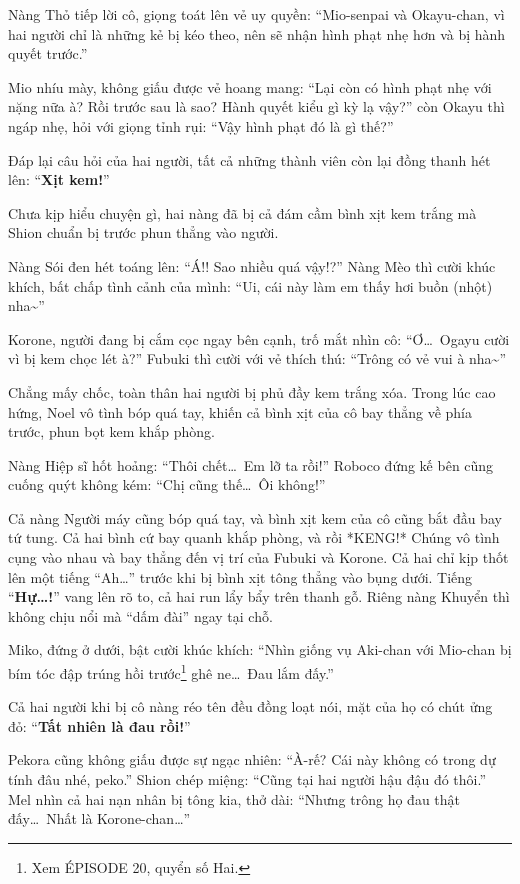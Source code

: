 \documentclass[../main.tex]{subfiles}
\begin{document}
Nàng Thỏ tiếp lời cô, giọng toát lên vẻ uy quyền: ``Mio-senpai và Okayu-chan, vì hai người chỉ là những kẻ bị kéo theo, nên sẽ nhận hình phạt nhẹ hơn và bị hành quyết trước.''

Mio nhíu mày, không giấu được vẻ hoang mang: ``Lại còn có hình phạt nhẹ với nặng nữa à? Rồi trước sau là sao? Hành quyết kiểu gì kỳ lạ vậy?'' còn Okayu thì ngáp nhẹ, hỏi với giọng tỉnh rụi: ``Vậy hình phạt đó là gì thế?''

Đáp lại câu hỏi của hai người, tất cả những thành viên còn lại đồng thanh hét lên: ``\textbf{Xịt kem!}''

Chưa kịp hiểu chuyện gì, hai nàng đã bị cả đám cầm bình xịt kem trắng mà Shion chuẩn bị trước phun thẳng vào người.

Nàng Sói đen hét toáng lên: ``Á!! Sao nhiều quá vậy!?'' Nàng Mèo thì cười khúc khích, bất chấp tình cảnh của mình: ``Ui, cái này làm em thấy hơi buồn (nhột) nha\~{}''

Korone, người đang bị cắm cọc ngay bên cạnh, trố mắt nhìn cô: ``Ơ\dots\ Ogayu cười vì bị kem chọc lét à?'' Fubuki thì cười với vẻ thích thú: ``Trông có vẻ vui à nha\~{}''

Chẳng mấy chốc, toàn thân hai người bị phủ đầy kem trắng xóa. Trong lúc cao hứng, Noel vô tình bóp quá tay, khiến cả bình xịt của cô bay thẳng về phía trước, phun bọt kem khắp phòng.

Nàng Hiệp sĩ hốt hoảng: ``Thôi chết\dots\ Em lỡ ta rồi!'' Roboco đứng kế bên cũng cuống quýt không kém: ``Chị cũng thế\dots\ Ôi không!''

Cả nàng Người máy cũng bóp quá tay, và bình xịt kem của cô cũng bắt đầu bay tứ tung. Cả hai bình cứ bay quanh khắp phòng, và rồi *KENG!* Chúng vô tình cụng vào nhau và bay thẳng đến vị trí của Fubuki và Korone. Cả hai chỉ kịp thốt lên một tiếng ``Ah\dots'' trước khi bị bình xịt tông thẳng vào bụng dưới. Tiếng ``\textbf{Hự\dots!}'' vang lên rõ to, cả hai run lẩy bẩy trên thanh gỗ. Riêng nàng Khuyển thì không chịu nổi mà ``dấm đài'' ngay tại chỗ.

Miko, đứng ở dưới, bật cười khúc khích: ``Nhìn giống vụ Aki-chan với Mio-chan bị bím tóc đập trúng hồi trước\footnote{Xem {\flaregothic ÉPISODE 20}, quyển số Hai.} ghê ne\dots\ Đau lắm đấy.''

Cả hai người khi bị cô nàng réo tên đều đồng loạt nói, mặt của họ có chút ửng đỏ: ``\textbf{Tất nhiên là đau rồi!}''

Pekora cũng không giấu được sự ngạc nhiên: ``À-rế? Cái này không có trong dự tính đâu nhé, peko.'' Shion chép miệng: ``Cũng tại hai người hậu đậu đó thôi.'' Mel nhìn cả hai nạn nhân bị tông kia, thở dài: ``Nhưng trông họ đau thật đấy\dots\ Nhất là Korone-chan\dots''
\end{document}
